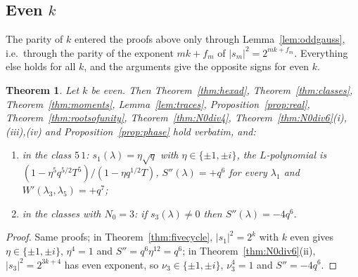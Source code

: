 ﻿\documentclass[12pt,a4paper]{amsart}
\newtheorem{theorem}{Theorem}[section]
\theoremstyle{definition}
\newcommand{\Spp}{S''}
\begin{document}
\subsection{Even \texorpdfstring{$k$}{k}}\label{subsec:evenk}
The parity of $k$ entered the proofs above only through Lemma~\ref{lem:oddgauss}, i.e.\ through the parity of the exponent $mk+f_m$ of $|s_m|^2=2^{mk+f_m}$. Everything else holds for all $k$, and the arguments give the opposite signs for even $k$.

\begin{theorem}\label{thm:evenk}
Let $k$ be even. Then Theorem~\ref{thm:hexad}, Theorem~\ref{thm:classes}, Theorem~\ref{thm:moments}, Lemma~\ref{lem:traces}, Proposition~\ref{prop:real}, Theorem~\ref{thm:rootsofunity}, Theorem~\ref{thm:N0div4}, Theorem~\ref{thm:N0div6}\textup{(i),(iii),(iv)} and Proposition~\ref{prop:phase} hold verbatim, and:
\begin{enumerate}[label=\textup{(\roman*)},leftmargin=2em]
\item in the class $5\,1$: $s_1(\lambda)=\eta\sqrt q$ with $\eta\in\{\pm1,\pm i\}$, the $L$-polynomial is $(1-\eta^5q^{5/2}T^5)/(1-\eta q^{1/2}T)$, $\Spp(\lambda)=+q^6$ for every $\lambda_1$ and $W'(\lambda_3,\lambda_5)=+q^7$;
\item in the classes with $N_0=3$: if $s_3(\lambda)\ne0$ then $\Spp(\lambda)=-4q^6$.
\end{enumerate}
\end{theorem}
\begin{proof}
Same proofs; in Theorem~\ref{thm:fivecycle}, $|s_1|^2=2^k$ with $k$ even gives $\eta\in\{\pm1,\pm i\}$, $\eta^4=1$ and $\Spp=q^6\eta^{12}=q^6$; in Theorem~\ref{thm:N0div6}(ii), $|s_3|^2=2^{3k+4}$ has even exponent, so $\nu_3\in\{\pm1,\pm i\}$, $\nu_3^4=1$ and $\Spp=-4q^6$.
\end{proof}
\end{document}
